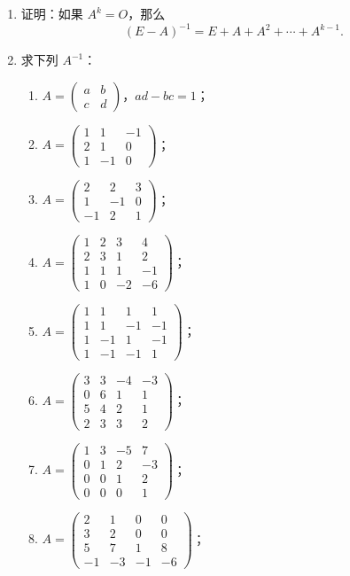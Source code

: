 \begin{enumerate}
  \[
    \text{秩}(A)+\text{秩}(B)\leqslant n.
  \]
  \ansproof
  \item 证明：如果 $A^k=O$，那么
  \[
    (E-A)^{-1}=E+A+A^2+\cdots+A^{k-1}.
  \]
  \ansproof
  \item 求下列 $A^{-1}$：
  \begin{enumerate}
    \item $A=\begin{pmatrix}a&b\\c&d\end{pmatrix}$，$ad-bc=1$；
  \anssub
    \item $A=\begin{pmatrix}1&1&-1\\2&1&0\\1&-1&0\end{pmatrix}$；
  \anssub
    \item $A=\begin{pmatrix}2&2&3\\1&-1&0\\-1&2&1\end{pmatrix}$；
  \anssub
    \item $A=\begin{pmatrix}1&2&3&4\\2&3&1&2\\1&1&1&-1\\1&0&-2&-6\end{pmatrix}$；
  \anssub
    \item $A=\begin{pmatrix}1&1&1&1\\1&1&-1&-1\\1&-1&1&-1\\1&-1&-1&1\end{pmatrix}$；
  \anssub
    \item $A=\begin{pmatrix}3&3&-4&-3\\0&6&1&1\\5&4&2&1\\2&3&3&2\end{pmatrix}$；
  \anssub
    \item $A=\begin{pmatrix}1&3&-5&7\\0&1&2&-3\\0&0&1&2\\0&0&0&1\end{pmatrix}$；
  \anssub
    \item $A=\begin{pmatrix}2&1&0&0\\3&2&0&0\\5&7&1&8\\-1&-3&-1&-6\end{pmatrix}$；

\end{enumerate}
\end{enumerate}

